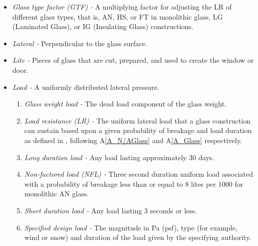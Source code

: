 \documentclass[12pt]{article}
\newcommand{\aref}[1]{A\ref{#1}}
\begin{document}
\begin{itemize}
\begin{enumerate}
\item \textit{Heat strengthened (HS) -} A flat, monolithic, glass lite of 
uniform thickness that has been subjected to a special heat treatment process 
where the residual surface compression is not less than 24 MPa (3500 psi) or 
greater than 52 MPa (7500 psi), as defined in \cite{ASTM2012a}.

\end{enumerate}
  
\item \textit{Glass type factor (GTF) -} A multiplying factor for adjusting the 
LR of different glass types, that is, AN, HS, or FT in monolithic glass, LG
(Laminated Glass), or IG (Insulating Glass) constructions.  

\item \textit{Lateral -} Perpendicular to the glass surface.

\item \textit{Lite -} Pieces of glass that are cut, prepared, and used to create the window or door.

\item \textit{Load -} A uniformly distributed lateral pressure.

\begin{enumerate}
\item \textit{Glass weight load -} The dead load component of the glass weight. 
\item \textit{Load resistance (LR) -} The uniform lateral load that a glass 
construction can sustain based upon a given probability of breakage and load 
duration as defined in \cite[(pg. 1, 53)]{ASTM2009}, following \aref{A_N/AGlass} and \aref{A_Glass} respectively.
\item \textit{Long duration load -} Any load lasting approximately 30 days. 
\item \textit{Non-factored load (NFL) -} Three second duration uniform load 
associated with a probability of breakage less than or equal to 8 lites per 1000 
for monolithic AN glass.
\item \textit{Short duration load -} Any load lasting 3 seconds or less.
\item \textit{Specified design load -} The magnitude in Pa (psf), type (for 
example, wind or snow) and duration of the load given by the specifying authority.


\end{enumerate}
\end{itemize}
\end{document}
